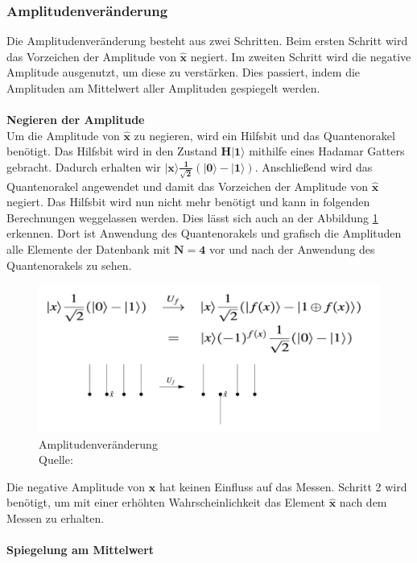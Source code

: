 \subsubsection{Amplitudenveränderung}
Die Amplitudenveränderung besteht aus zwei Schritten. Beim ersten Schritt wird das Vorzeichen der Amplitude von $\mathbf{\hat x}$ negiert. Im zweiten Schritt wird die negative Amplitude ausgenutzt, um diese zu verstärken. Dies passiert, indem die Amplituden am Mittelwert aller Amplituden gespiegelt werden. 
\\ \\
\textbf{Negieren der Amplitude}
\\
Um die Amplitude von $\mathbf{\hat x}$ zu negieren, wird ein Hilfsbit und das Quantenorakel benötigt. Das Hilfsbit wird in den Zustand $\mathbf{H|1\rangle}$ mithilfe eines Hadamar Gatters gebracht. Dadurch erhalten wir $\mathbf{|x\rangle \frac{1}{\sqrt 2}(|0\rangle - |1\rangle )}$. Anschließend wird das Quantenorakel angewendet und damit das Vorzeichen der Amplitude von $\mathbf{\hat{x}}$ negiert. Das Hilfsbit wird nun nicht mehr benötigt und kann in folgenden Berechnungen weggelassen werden. Dies lässt sich auch an der Abbildung \ref{fig:changeAmplitude} erkennen. Dort ist Anwendung des Quantenorakels und grafisch die Amplituden alle Elemente der Datenbank mit $\mathbf{N=4}$ vor und nach der Anwendung des Quantenorakels zu sehen.
\begin{figure}[hbtp]
	\centering
	\includegraphics[width=.8\textwidth]{figures/amplitudenveraenderung.png}
	\caption{Amplitudenveränderung \\ Quelle: \cite[S. 141]{Ho17}}
	\label{fig:changeAmplitude}
\end{figure}
Die negative Amplitude von $\mathbf{\hat x}$ hat keinen Einfluss auf das Messen. Schritt 2 wird benötigt, um mit einer erhöhten Wahrscheinlichkeit das Element $\mathbf{\hat x}$ nach dem Messen zu erhalten.
\\\\
\textbf{Spiegelung am Mittelwert} \\
\label{sec:spiegelnAmMittelwert} 
